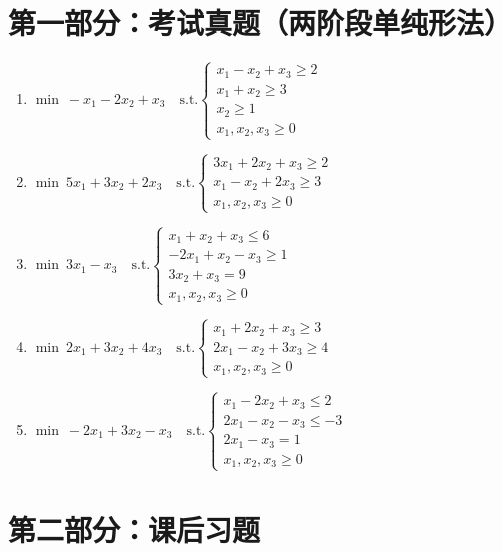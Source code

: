 \documentclass{article}
\begin{document}
\section*{第一部分：考试真题（两阶段单纯形法）}
\begin{enumerate}
    \item $\min\ -x_1 - 2x_2 + x_3 \quad \text{s.t.} \begin{cases} x_1 - x_2 + x_3 \ge 2 \\ x_1 + x_2 \ge 3 \\ x_2 \ge 1 \\ x_1, x_2, x_3 \ge 0 \end{cases}$
    \item $\min\ 5x_1 + 3x_2 + 2x_3 \quad \text{s.t.} \begin{cases} 3x_1 + 2x_2 + x_3 \ge 2 \\ x_1 - x_2 + 2x_3 \ge 3 \\ x_1, x_2, x_3 \ge 0 \end{cases}$
    \item $\min\ 3x_1 - x_3 \quad \text{s.t.} \begin{cases} x_1 + x_2 + x_3 \le 6 \\ -2x_1 + x_2 - x_3 \ge 1 \\ 3x_2 + x_3 = 9 \\ x_1, x_2, x_3 \ge 0 \end{cases}$
    \item $\min\ 2x_1 + 3x_2 + 4x_3 \quad \text{s.t.} \begin{cases} x_1 + 2x_2 + x_3 \ge 3 \\ 2x_1 - x_2 + 3x_3 \ge 4 \\ x_1, x_2, x_3 \ge 0 \end{cases}$
    \item $\min\ -2x_1 + 3x_2 - x_3 \quad \text{s.t.} \begin{cases} x_1 - 2x_2 + x_3 \le 2 \\ 2x_1 - x_2 - x_3 \le -3 \\ 2x_1 - x_3 = 1 \\ x_1, x_2, x_3 \ge 0 \end{cases}$
\end{enumerate}

\section*{第二部分：课后习题}
\end{document}
